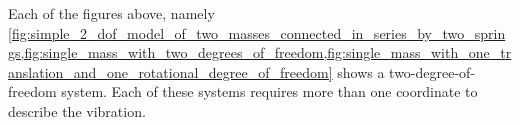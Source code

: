   Each of the figures above, namely \cref{fig:simple_2_dof_model_of_two_masses_connected_in_series_by_two_springs,fig:single_mass_with_two_degrees_of_freedom,fig:single_mass_with_one_translation_and_one_rotational_degree_of_freedom} shows a two-degree-of-freedom system. Each of these systems requires more than one coordinate to describe the vibration.
